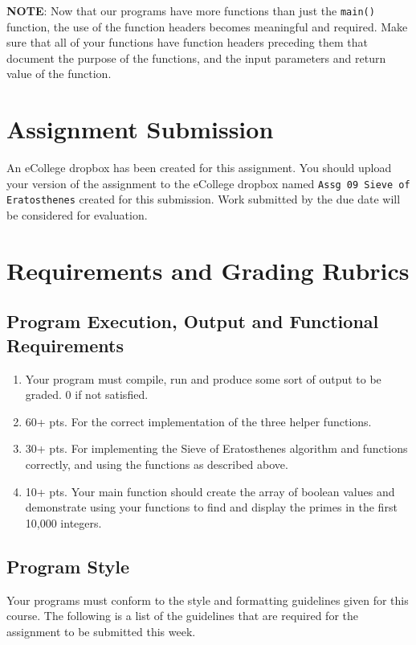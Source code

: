 \documentclass[11pt]{article}
\begin{document}
\textbf{NOTE}: Now that our programs have more functions than just the
\verb~main()~ function, the use of the function headers becomes meaningful
and required.  Make sure that all of your functions have function
headers preceding them that document the purpose of the functions, and
the input parameters and return value of the function.
\section*{Assignment Submission}
\label{sec-4}

An eCollege dropbox has been created for this assignment.  You should
upload your version of the assignment to the eCollege dropbox named
\verb~Assg 09 Sieve of Eratosthenes~ created for this submission.  Work
submitted by the due date will be considered for evaluation.
\section*{Requirements and Grading Rubrics}
\label{sec-5}

\subsection*{Program Execution, Output and Functional Requirements}
\label{sec-5-1}

\begin{enumerate}
\item Your program must compile, run and produce some sort of output to
be graded. 0 if not satisfied.
\item 60+ pts. For the correct implementation of the three helper functions.
\item 30+ pts. For implementing the Sieve of Eratosthenes algorithm and functions
correctly, and using the functions as described above.
\item 10+ pts. Your main function should create the array of boolean values
and demonstrate using your functions to find and display the primes in
the first 10,000 integers.
\end{enumerate}

\subsection*{Program Style}
\label{sec-5-2}

Your programs must conform to the style and formatting guidelines
given for this course.  The following is a list of the guidelines that
are required for the assignment to be submitted this week.
\end{document}
